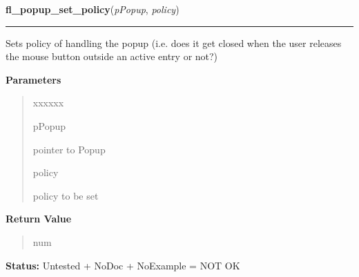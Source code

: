 \hspace{.8\funcindent}\begin{boxedminipage}{\funcwidth}

    \raggedright \textbf{fl\_popup\_set\_policy}(\textit{pPopup}, \textit{policy})

    \vspace{-1.5ex}

    \rule{\textwidth}{0.5\fboxrule}
\setlength{\parskip}{2ex}
    Sets policy of handling the popup (i.e. does it get closed when the 
    user releases the mouse button outside an active entry or not?)

\setlength{\parskip}{1ex}
      \textbf{Parameters}
      \vspace{-1ex}

      \begin{quote}
        \begin{Ventry}{xxxxxx}

          \item[pPopup]

          pointer to Popup

          \item[policy]

          policy to be set

        \end{Ventry}

      \end{quote}

      \textbf{Return Value}
    \vspace{-1ex}

      \begin{quote}
      num

      \end{quote}

\textbf{Status:} Untested + NoDoc + NoExample = NOT OK



    \end{boxedminipage}

    \label{xformslib:library:fl_popup_set_callback}

    \vspace{0.5ex}

